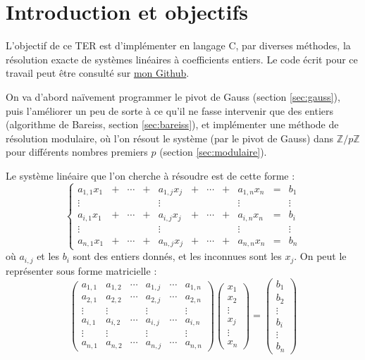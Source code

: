 \documentclass[french]{article}
\begin{document}
\section{Introduction et objectifs} \label{sec:intro}
L'objectif de ce TER est d'implémenter en langage C, par diverses méthodes, la résolution exacte de systèmes linéaires à coefficients entiers. Le code écrit pour ce travail peut être consulté sur \href{https://github.com/Barni072/TER}{mon Github}.
\par On va d'abord naïvement programmer le pivot de Gauss (section \ref{sec:gauss}), puis l'améliorer un peu de sorte à ce qu'il ne fasse intervenir que des entiers (algorithme de Bareiss, section \ref{sec:bareiss}), et implémenter une méthode de résolution modulaire, où l'on résout le système (par le pivot de Gauss) dans $\mathbb{Z}/p\mathbb{Z}$ pour différents nombres premiers $p$ (section \ref{sec:modulaire}).
\par
Le système linéaire que l'on cherche à résoudre est de cette forme :
\newline
$$\left \{
\begin{array}{ccccccccccc}
	a_{1,1} x_1 &+ &\cdots &+ &a_{1,j} x_j &+ &\cdots &+ &a_{1,n} x_n &= & b_1\\
	\vdots & & & & \vdots & & & & \vdots & & \vdots\\
	a_{i,1} x_1 &+ &\cdots &+ &a_{i,j} x_j &+ &\cdots &+ &a_{i,n} x_n &= & b_i\\
	\vdots & & & & \vdots & & & & \vdots & & \vdots\\
	a_{n,1} x_1 &+ &\cdots &+ &a_{n,j} x_j &+ &\cdots &+ &a_{n,n} x_n &= & b_n
\end{array}
\right.
$$
où $a_{i,j}$ et les $b_i$ sont des entiers donnés, et les inconnues sont les $x_j$.
\newline
On peut le représenter sous forme matricielle :
\begin{equation*}
	\begin{pmatrix}
		a_{1,1} & a_{1,2} & \cdots & a_{1,j} & \cdots & a_{1,n}\\
		a_{2,1} & a_{2,2} & \cdots & a_{2,j} & \cdots & a_{2,n}\\
		\vdots  & \vdots  & & \vdots & & \vdots\\
		a_{i,1} & a_{i,2} & \cdots & a_{i,j} & \cdots & a_{i,n}\\
		\vdots  & \vdots  &  & \vdots & &\vdots\\
		a_{n,1} & a_{n,2} & \cdots & a_{n,j} & \cdots & a_{n,n}
	\end{pmatrix}
	\begin{pmatrix}
		x_1\\
		x_2\\
		\vdots\\
		x_j\\
		\vdots\\
		x_n
	\end{pmatrix}
	=
	\begin{pmatrix}
		b_1\\
		b_2\\
		\vdots\\
		b_i\\
		\vdots\\
		b_n
	\end{pmatrix}
\end{equation*}
\end{document}
